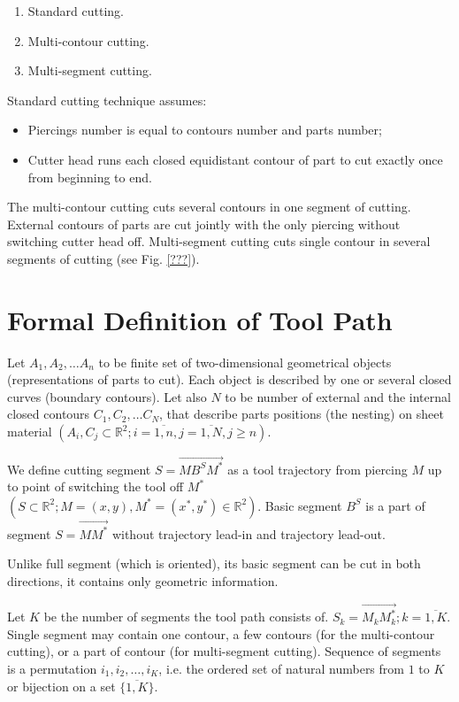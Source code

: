 \documentclass{../download/tPRS2e}
\begin{document}
\begin{enumerate}
\item Standard cutting. 
\item Multi-contour cutting.
\item Multi-segment cutting.
\end{enumerate}

Standard cutting technique assumes:

\begin{itemize}
\item Piercings number is equal to contours number and parts number;
\item Cutter head runs each closed equidistant contour of part to cut exactly once from beginning to end. 
\end{itemize}

The multi-contour cutting cuts several contours in one segment of cutting.
External contours of parts are cut jointly with the only piercing without switching cutter head off.
Multi-segment cutting cuts single contour in several segments of cutting (see Fig. \ref{???}).

\section{Formal Definition of Tool Path}

Let $A_1, A_2, \dots A_n$ to be finite set of two-dimensional geometrical objects
(representations of parts to cut).
Each object is described by one or several closed curves (boundary contours). 
Let also $N$ to be number of external and the internal closed contours $C_1, C_2, \dots C_N$,
that describe parts positions (the nesting) on sheet material
$(A_i, C_j \subset \mathbb{R}^2; i = \overline{1,n}, j = \overline{1, N}, j \ge n )$.

We define cutting segment  $S = \overrightarrow{M B^S M^*}$
as a tool trajectory from piercing  $M$ up to point of switching the tool off  $M^*$
$(S \subset \mathbb{R}^2; M = (x, y), M^ *= (x^*, y^*) \in \mathbb{R}^2)$.
Basic segment $B^S$ is a part of segment $S = \overrightarrow{M M^*}$
without trajectory lead-in and trajectory lead-out.

Unlike full segment (which is oriented),
its basic segment can be cut in both directions,
it contains only geometric information.

Let $K$ be the number of segments the tool path consists of.
$S_k = \overrightarrow{M_k M_k^*}; k = \overline{1, K}$.
Single segment may contain one contour,
a few contours (for the multi-contour cutting),
or a part of contour (for multi-segment cutting).
Sequence of segments is a permutation $i_1, i_2, \dots, i_K$,
i.e. the ordered set of natural numbers from $1$ to $K$
or bijection on a set $\{\overline{1, K}\}$.
\end{document}
